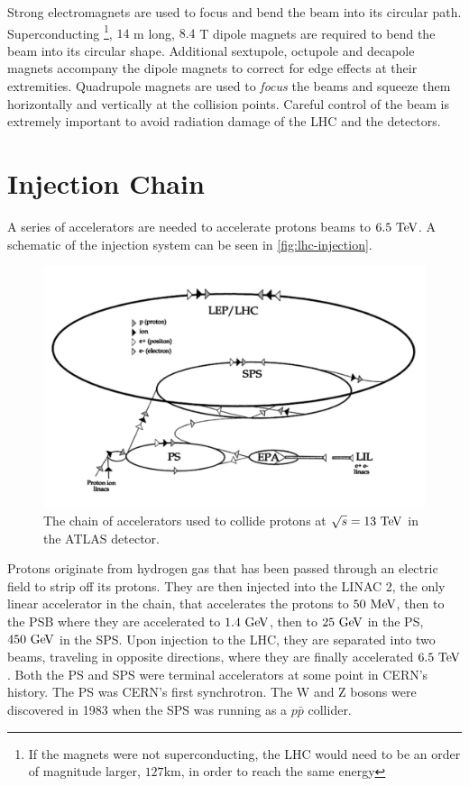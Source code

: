 Strong electromagnets are used to focus and bend the beam into its circular path. Superconducting \footnote{If the magnets were not superconducting, the \ac{LHC} would need to be an order of magnitude larger, $127 \textrm{km}$, in order to reach the same energy}, $14$ m long, $8.4$ T dipole magnets are required to bend the beam into its circular shape. Additional sextupole, octupole and decapole magnets accompany the dipole magnets to  correct for edge effects at their extremities. Quadrupole magnets are used to \emph{focus} the beams and squeeze them horizontally and vertically at the collision points. Careful control of the beam is extremely important to avoid radiation damage of the \ac{LHC} and the detectors. 

\section{Injection Chain}

A series of accelerators are needed to accelerate protons beams to $6.5 \TeV$. A schematic of the injection system can be seen in \autoref{fig:lhc-injection}. 

\begin{figure}[htbp]
\centering
\includegraphics[width=.6\textwidth]{figures/Detector/lhc-injectors.png}
\caption{The chain of accelerators used to collide protons at $\sqrt{s} = 13 \TeV$ in the \ac{ATLAS} detector. \cite{accelerator-sketch} }
\label{fig:lhc-injection}
\end{figure}

Protons originate from hydrogen gas that has been passed through an electric field to strip off its protons. They are then injected into the \ac{LINAC} 2, the only linear accelerator in the chain, that accelerates the protons to $50 \MeV$, then to the \ac{PSB} where they are accelerated to $1.4 \GeV$, then to $25 \GeV$ in the \ac{PS}, $450 \GeV$ in the \ac{SPS}. Upon injection to the \ac{LHC}, they are separated into two beams, traveling in opposite directions, where they are finally accelerated $6.5 \TeV$. Both the \ac{PS} and \ac{SPS} were terminal accelerators at some point in \ac{CERN}'s history. The \ac{PS} was \ac{CERN}'s first synchrotron. The W and Z bosons were discovered in 1983 when the \ac{SPS} was running as a $p\bar{p}$ collider.


